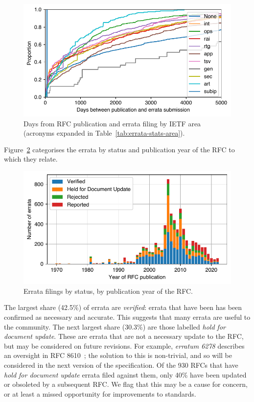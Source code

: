 \documentclass[twocolumn,10pt]{article}
\newlength{\figureWidthOneColumn}
\newcommand{\pb}[1]{\vspace{0.75ex}\noindent{\textbf{#1}}}
\begin{document}
\begin{figure}
  \centering
  \includegraphics[width=\figureWidthOneColumn]{figures-prev/tma-2023/errata-submission-dates-area.pdf}
  \caption{
    Days from RFC publication and errata filing by IETF area (acronyms
    expanded in Table~\ref{tab:errata-stats-area}).
  }
  \label{fig:errata_submission_days}
\end{figure}


\pb{Errata Status:}
Figure~\ref{fig:errata_status} categorises the errata by status and
publication year of the RFC to which they relate. 

\begin{figure}
  \centering
  \includegraphics[width=\figureWidthOneColumn]{figures-prev/tma-2023/errata-by-status.pdf}
  \caption{
    Errata filings by status, by publication year of the RFC.
  }
  \label{fig:errata_status}
\end{figure}

The largest share (42.5\%) of errata are \emph{verified}: errata that have
been has been confirmed as necessary and accurate. This suggests that many
errata are useful to the community. The next largest share (30.3\%) are
those labelled \emph{hold for document update}.  These are errata that are
not a necessary update to the RFC, but may be considered on future
revisions. For example, \emph{erratum 6278} describes an oversight in RFC
8610~\cite{rfc8610}; the solution to this is non-trivial, and so will be
considered in the next version of the specification. Of the 930 RFCs that
have \emph{hold for document update} errata filed against them, only 40\%
have been updated or obsoleted by a subsequent RFC.  We flag that this may
be a cause for concern, or at least a missed opportunity for improvements
to standards.
\end{document}
